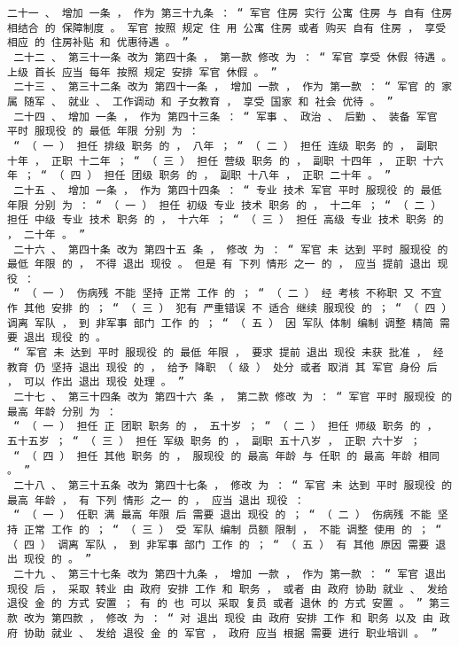 \documentclass{article}
\begin{document}
\begin{Verbatim}[commandchars=\\\{\}]
 二十一 、 增加 一条 ， 作为 第三十九条 ： “ 军官 住房 实行 公寓 住房 与 自有 住房 相结合 的 保障制度 。 军官 按照 规定 住 用 公寓 住房 或者 购买 自有 住房 ， 享受 相应 的 住房补贴 和 优惠待遇 。 ” 
 二十二 、 第三十一条 改为 第四十条 ， 第一款 修改 为 ： “ 军官 享受 休假 待遇 。 上级 首长 应当 每年 按照 规定 安排 军官 休假 。 ” 
 二十三 、 第三十二条 改为 第四十一条 ， 增加 一款 ， 作为 第一款 ： “ 军官 的 家属 随军 、 就业 、 工作调动 和 子女教育 ， 享受 国家 和 社会 优待 。 ” 
 二十四 、 增加 一条 ， 作为 第四十三条 ： “ 军事 、 政治 、 后勤 、 装备 军官 平时 服现役 的 最低 年限 分别 为 ： 
 “ （ 一 ） 担任 排级 职务 的 ， 八年 ； “ （ 二 ） 担任 连级 职务 的 ， 副职 十年 ， 正职 十二年 ； “ （ 三 ） 担任 营级 职务 的 ， 副职 十四年 ， 正职 十六年 ； “ （ 四 ） 担任 团级 职务 的 ， 副职 十八年 ， 正职 二十年 。 ” 
 二十五 、 增加 一条 ， 作为 第四十四条 ： “ 专业 技术 军官 平时 服现役 的 最低 年限 分别 为 ： “ （ 一 ） 担任 初级 专业 技术 职务 的 ， 十二年 ； “ （ 二 ） 担任 中级 专业 技术 职务 的 ， 十六年 ； “ （ 三 ） 担任 高级 专业 技术 职务 的 ， 二十年 。 ” 
 二十六 、 第四十条 改为 第四十五 条 ， 修改 为 ： “ 军官 未 达到 平时 服现役 的 最低 年限 的 ， 不得 退出 现役 。 但是 有 下列 情形 之一 的 ， 应当 提前 退出 现役 ： 
 “ （ 一 ） 伤病残 不能 坚持 正常 工作 的 ； “ （ 二 ） 经 考核 不称职 又 不宜 作 其他 安排 的 ； “ （ 三 ） 犯有 严重错误 不 适合 继续 服现役 的 ； “ （ 四 ） 调离 军队 ， 到 非军事 部门 工作 的 ； “ （ 五 ） 因 军队 体制 编制 调整 精简 需要 退出 现役 的 。 
 “ 军官 未 达到 平时 服现役 的 最低 年限 ， 要求 提前 退出 现役 未获 批准 ， 经 教育 仍 坚持 退出 现役 的 ， 给予 降职 （ 级 ） 处分 或者 取消 其 军官 身份 后 ， 可以 作出 退出 现役 处理 。 ” 
 二十七 、 第三十四条 改为 第四十六 条 ， 第二款 修改 为 ： “ 军官 平时 服现役 的 最高 年龄 分别 为 ： 
 “ （ 一 ） 担任 正 团职 职务 的 ， 五十岁 ； “ （ 二 ） 担任 师级 职务 的 ， 五十五岁 ； “ （ 三 ） 担任 军级 职务 的 ， 副职 五十八岁 ， 正职 六十岁 ； 
 “ （ 四 ） 担任 其他 职务 的 ， 服现役 的 最高 年龄 与 任职 的 最高 年龄 相同 。 ” 
 二十八 、 第三十五条 改为 第四十七条 ， 修改 为 ： “ 军官 未 达到 平时 服现役 的 最高 年龄 ， 有 下列 情形 之一 的 ， 应当 退出 现役 ： 
 “ （ 一 ） 任职 满 最高 年限 后 需要 退出 现役 的 ； “ （ 二 ） 伤病残 不能 坚持 正常 工作 的 ； “ （ 三 ） 受 军队 编制 员额 限制 ， 不能 调整 使用 的 ； “ （ 四 ） 调离 军队 ， 到 非军事 部门 工作 的 ； “ （ 五 ） 有 其他 原因 需要 退出 现役 的 。 ” 
 二十九 、 第三十七条 改为 第四十九条 ， 增加 一款 ， 作为 第一款 ： “ 军官 退出 现役 后 ， 采取 转业 由 政府 安排 工作 和 职务 ， 或者 由 政府 协助 就业 、 发给 退役 金 的 方式 安置 ； 有 的 也 可以 采取 复员 或者 退休 的 方式 安置 。 ” 第三款 改为 第四款 ， 修改 为 ： “ 对 退出 现役 由 政府 安排 工作 和 职务 以及 由 政府 协助 就业 、 发给 退役 金 的 军官 ， 政府 应当 根据 需要 进行 职业培训 。 ” 

\end{Verbatim}
\end{document}

